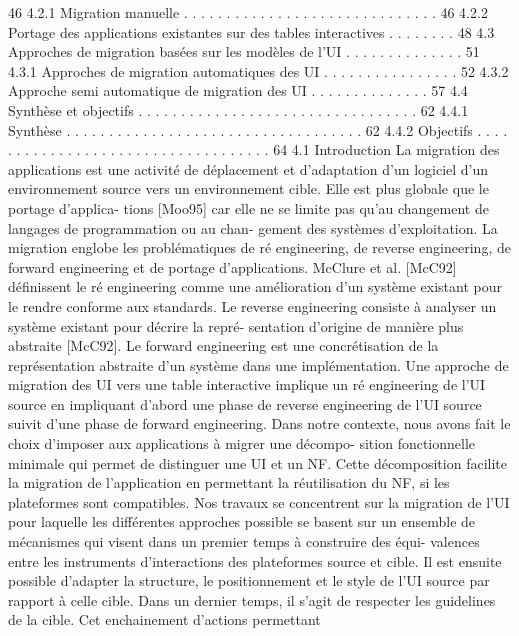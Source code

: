 \documentclass{article}
\begin{document}
46
4.2.1
Migration manuelle . . . . . . . . . . . . . . . . . . . . . . . . . . . . . .
46
4.2.2
Portage des applications existantes sur des tables interactives . . . . . . . .
48
4.3
Approches de migration basées sur les modèles de l’UI . . . . . . . . . . . . . .
51
4.3.1
Approches de migration automatiques des UI . . . . . . . . . . . . . . . .
52
4.3.2
Approche semi automatique de migration des UI . . . . . . . . . . . . . .
57
4.4
Synthèse et objectifs . . . . . . . . . . . . . . . . . . . . . . . . . . . . . . . . .
62
4.4.1
Synthèse
. . . . . . . . . . . . . . . . . . . . . . . . . . . . . . . . . . .
62
4.4.2
Objectifs
. . . . . . . . . . . . . . . . . . . . . . . . . . . . . . . . . . .
64
4.1
Introduction
La migration des applications est une activité de déplacement et d’adaptation d’un logiciel d’un
environnement source vers un environnement cible. Elle est plus globale que le portage d’applica-
tions [Moo95] car elle ne se limite pas qu’au changement de langages de programmation ou au chan-
gement des systèmes d’exploitation. La migration englobe les problématiques de ré engineering, de
reverse engineering, de forward engineering et de portage d’applications. McClure et al. [McC92]
déﬁnissent le ré engineering comme une amélioration d’un système existant pour le rendre conforme
aux standards. Le reverse engineering consiste à analyser un système existant pour décrire la repré-
sentation d’origine de manière plus abstraite [McC92]. Le forward engineering est une concrétisation
de la représentation abstraite d’un système dans une implémentation. Une approche de migration des
UI vers une table interactive implique un ré engineering de l’UI source en impliquant d’abord une
phase de reverse engineering de l’UI source suivit d’une phase de forward engineering.
Dans notre contexte, nous avons fait le choix d’imposer aux applications à migrer une décompo-
sition fonctionnelle minimale qui permet de distinguer une UI et un NF. Cette décomposition facilite
la migration de l’application en permettant la réutilisation du NF, si les plateformes sont compatibles.
Nos travaux se concentrent sur la migration de l’UI pour laquelle les différentes approches possible
se basent sur un ensemble de mécanismes qui visent dans un premier temps à construire des équi-
valences entre les instruments d’interactions des plateformes source et cible. Il est ensuite possible
d’adapter la structure, le positionnement et le style de l’UI source par rapport à celle cible. Dans un
dernier temps, il s’agit de respecter les guidelines de la cible. Cet enchainement d’actions permettant
\end{document}
